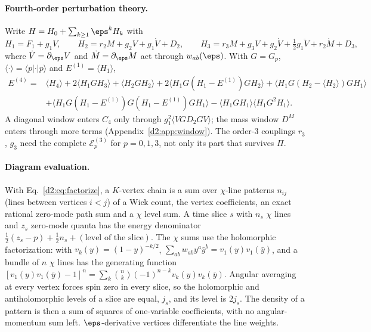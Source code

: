 \paragraph{Fourth-order perturbation theory.} Write $H=H_0+\sum_{k\ge1}\eps^kH_k$ with
\begin{equation}
 H_1=F_1+g_1V,\qquad H_2=r_2M+g_2V+g_1\dot V+D_2,\qquad H_3=r_3M+g_3V+g_2\dot V+\tfrac12g_1\ddot V+r_2\dot M+D_3 ,
\end{equation}
where $\dot V=\partial_\eps V$ and $\dot M=\partial_\eps M$ act through $w_{ab}(\eps)$. With $G=G_p$, $\langle\cdot\rangle=\langle
p|\cdot|p\rangle$ and $E^{(1)}=\langle H_1\rangle$,
\begin{align}
 E^{(4)}={}&\langle H_4\rangle+2\langle H_1GH_3\rangle+\langle H_2GH_2\rangle+2\langle H_1G(H_1-E^{(1)})GH_2\rangle
 +\langle H_1G(H_2-\langle H_2\rangle)GH_1\rangle\nonumber\\
 &+\langle H_1G(H_1-E^{(1)})G(H_1-E^{(1)})GH_1\rangle-\langle H_1GH_1\rangle\langle H_1G^2H_1\rangle .
\end{align}
A diagonal window enters $C_4$ only through $g_1^2\langle VGD_2GV\rangle$; the mass window $D^M$ enters through more
terms (Appendix~\ref{d2:app:window}). The order-3 couplings $r_3$, $g_3$ need the complete
$\mathcal E^{(3)}_p$ for $p=0,1,3$, not only its part that survives $\Pi$.

\paragraph{Diagram evaluation.} With Eq.~\eqref{d2:eq:factorize}, a $K$-vertex chain is a sum over $\chi$-line patterns
$n_{ij}$ (lines between vertices $i<j$) of a Wick count, the vertex coefficients, an exact rational zero-mode path sum and
a $\chi$ level sum. A time slice $s$ with $n_s$ $\chi$ lines and $z_s$ zero-mode quanta has the energy denominator
$\frac12(z_s-p)+\frac12n_s+(\text{level of the slice})$. The $\chi$ sums use the holomorphic factorization: with
$v_k(y)=(1-y)^{-k/2}$, $\sum_{ab}w_{ab}y^a\bar y^b=v_1(y)v_1(\bar y)$, and a bundle of $n$ $\chi$ lines has the generating
function $[v_1(y)v_1(\bar y)-1]^n=\sum_k\binom nk(-1)^{n-k}v_k(y)v_k(\bar y)$. Angular averaging at every vertex forces spin
zero in every slice, so the holomorphic and antiholomorphic levels of a slice are equal, $j_s$, and its level is $2j_s$.
The density of a pattern is then a sum of squares of one-variable coefficients, with no angular-momentum sum left.
$\eps$-derivative vertices differentiate the line weights.

